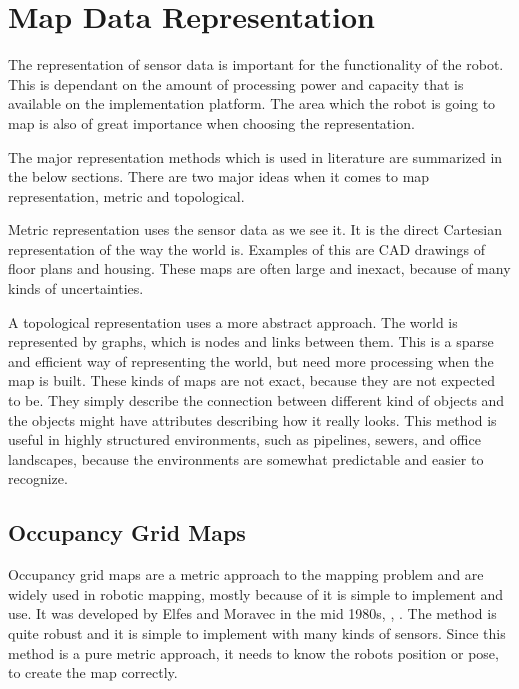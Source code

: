 \section{Map Data Representation}
\label{chap2:sec-representations}
The representation of sensor data is important for the functionality of the robot. This is
dependant on the amount of processing power and capacity that is available on the
implementation platform. 
The area which the robot is going to map is also of great importance when choosing the
representation. 

The major representation methods which is used in literature are summarized in the below
sections. There are two major ideas when it comes to map representation, 
metric and topological.

Metric representation uses the sensor data as we see it. It is the direct Cartesian
representation of the way the world is. Examples of this are CAD drawings of floor plans
and housing. These maps are often large and inexact, because of many kinds of
uncertainties.

A topological representation uses a more abstract approach. The world is represented by graphs,
which is nodes and links between them. This is a sparse and efficient way of representing
the world, but need more processing when the map is built. These kinds of maps are not
exact, because they are not expected to be. They simply describe the connection between
different kind of objects and the objects might have attributes describing how it really
looks. This method is useful in highly structured environments, such as pipelines, sewers,
and office landscapes, because the environments are somewhat predictable and easier to
recognize. 


\subsection{Occupancy Grid Maps}
Occupancy grid maps are a metric approach to the mapping problem and are widely used in 
robotic mapping, mostly because of it is simple to implement and use. It was developed 
by Elfes and Moravec in the mid 1980s, \cite{elfes}, \cite{moravec}. The method is quite 
robust and it is simple to implement with many kinds of sensors. Since this method is a
pure metric approach, it needs to know the robots position or pose, to create the map
correctly. 

